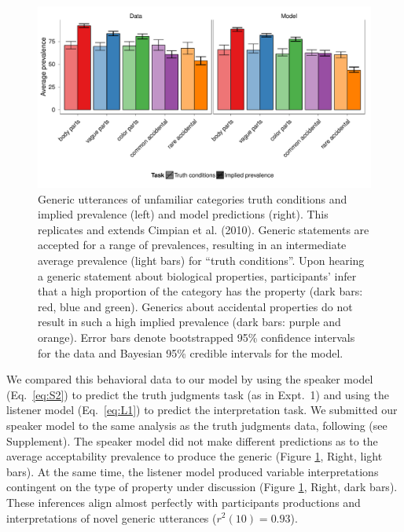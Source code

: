 \documentclass[10pt,letterpaper]{article}
\begin{document}
\begin{figure}
\centering
    \includegraphics[width=\columnwidth]{asym-data-model-2phi-2so-50k.pdf}
    \caption{Generic utterances of unfamiliar categories truth conditions and implied prevalence (left) and model predictions (right). 
    This replicates and extends Cimpian et al. (2010). 
    Generic statements are accepted for a range of prevalences, resulting in an intermediate average prevalence (light bars) for ``truth conditions''. 
    Upon hearing a generic statement about biological properties, participants' infer that a high proportion of the category has the property (dark bars: red, blue and green). 
    Generics about accidental properties do not result in such a high implied prevalence (dark bars: purple and orange).  
    Error bars denote bootstrapped 95\% confidence intervals for the data and Bayesian 95\% credible intervals for the model.}
  \label{fig:exp2b}
\end{figure}


We compared this behavioral data to our model by using the speaker model (Eq.~\ref{eq:S2}) to predict the truth judgments task (as in Expt.~1) and using the listener model (Eq.~\ref{eq:L1}) to predict the interpretation task. 
We submitted our speaker model to the same analysis as the truth judgments data, following  (see Supplement). 
The speaker model did not make different predictions as to the average acceptability prevalence to produce the generic (Figure \ref{fig:exp2b}, Right, light bars). 
At the same time, the listener model produced variable interpretations contingent on the type of property under discussion (Figure \ref{fig:exp2b}, Right, dark bars). These inferences align almost perfectly with participants productions and interpretations of novel generic utterances ($r^2(10) = 0.93$). 
\end{document}
